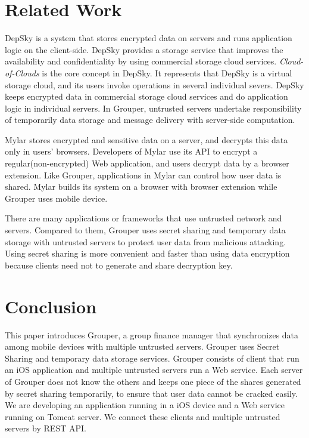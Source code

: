 \documentclass[twocolumn,10pt]{article}
\begin{document}
\section{Related Work}

DepSky\cite{bessani2013depsky} is a system that stores encrypted data on servers and runs application logic on the client-side. DepSky provides a storage service that improves the availability and confidentiality by using commercial storage cloud services. \emph{Cloud-of-Clouds} is the core concept in DepSky. It represents that DepSky is a virtual storage cloud, and its users invoke operations in several individual severs. DepSky keeps encrypted data in commercial storage cloud services and do application logic in individual servers. In Grouper,  untrusted servers undertake responsibility of temporarily data storage and message delivery with server-side computation.

Mylar\cite{popa2014building} stores encrypted and sensitive data on a server, and decrypts this data only in users’ browsers. Developers of Mylar use its API to encrypt a regular(non-encrypted) Web application, and users decrypt data by a browser extension. Like Grouper, applications in Mylar can control how user data is shared. Mylar builds its system on a browser with browser extension while Grouper uses mobile device.

There are many applications or frameworks that use untrusted network and servers. Compared to them, Grouper uses secret sharing and temporary data storage with untrusted servers to protect user data from malicious attacking. Using secret sharing is more convenient and faster than using data encryption because clients need not to generate and share decryption key.

\section{Conclusion}

This paper introduces Grouper, a group finance manager that synchronizes data among mobile devices with multiple untrusted servers. Grouper uses Secret Sharing and temporary data storage services. Grouper consists of client that run an iOS application and multiple untrusted servers run a Web service. Each server of Grouper does not know the others and keeps one piece of the shares generated by secret sharing temporarily, to ensure that user data cannot be cracked easily. We are developing an application running in a iOS device and a Web service running on Tomcat server. We connect these clients and multiple untrusted servers by REST API.



\end{document}

